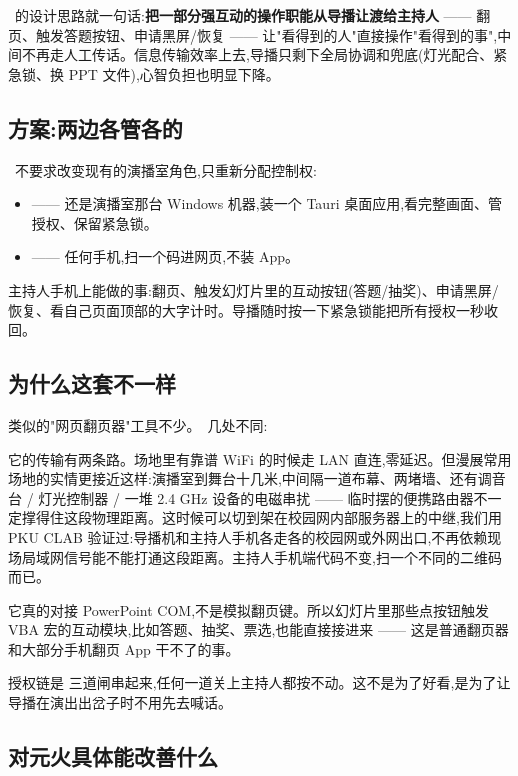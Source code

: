 \app\ 的设计思路就一句话:\textbf{把一部分强互动的操作职能从导播让渡给主持人} —— 翻页、触发答题按钮、申请黑屏/恢复 —— 让"看得到的人"直接操作"看得到的事",中间不再走人工传话。信息传输效率上去,导播只剩下全局协调和兜底(灯光配合、紧急锁、换 PPT 文件),心智负担也明显下降。

\subsection*{方案:两边各管各的}

\app\ 不要求改变现有的演播室角色,只重新分配控制权:

\begin{itemize}
  \item {} —— 还是演播室那台 Windows 机器,装一个 Tauri 桌面应用,看完整画面、管授权、保留紧急锁。
  \item {} —— 任何手机,扫一个码进网页,不装 App。
\end{itemize}

主持人手机上能做的事:翻页、触发幻灯片里的互动按钮(答题/抽奖)、申请黑屏/恢复、看自己页面顶部的大字计时。导播随时按一下紧急锁能把所有授权一秒收回。

\subsection*{为什么这套不一样}

类似的"网页翻页器"工具不少。\app\ 几处不同:

它的传输有两条路。场地里有靠谱 WiFi 的时候走 LAN 直连,零延迟。但漫展常用场地的实情更接近这样:演播室到舞台十几米,中间隔一道布幕、两堵墙、还有调音台 / 灯光控制器 / 一堆 2.4 GHz 设备的电磁串扰 —— 临时摆的便携路由器不一定撑得住这段物理距离。这时候可以切到架在校园网内部服务器上的中继,我们用 PKU CLAB 验证过:导播机和主持人手机各走各的校园网或外网出口,不再依赖现场局域网信号能不能打通这段距离。主持人手机端代码不变,扫一个不同的二维码而已。

它真的对接 PowerPoint COM,不是模拟翻页键。所以幻灯片里那些点按钮触发 VBA 宏的互动模块,比如答题、抽奖、票选,也能直接接进来 —— 这是普通翻页器和大部分手机翻页 App 干不了的事。

授权链是\,\,三道闸串起来,任何一道关上主持人都按不动。这不是为了好看,是为了让导播在演出出岔子时不用先去喊话。

\subsection*{对元火具体能改善什么}


